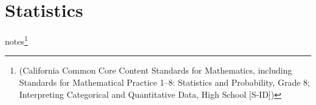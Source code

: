 \section[Statistics]{Statistics}























notes\footnote[6]{(California Common Core Content Standards for Mathematics, including Standards for Mathematical Practice
1–8: Statistics and Probability, Grade 8; Interpreting Categorical and Quantitative Data, High School [S-ID])}

